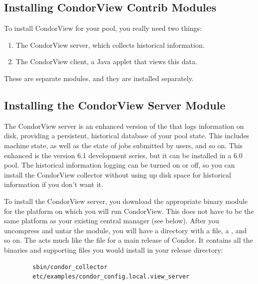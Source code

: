 \subsection{\label{sec:Contrib-CondorView-Install}
Installing CondorView Contrib Modules}


To install CondorView for your pool, you really need two things:
\begin{enumerate}
\item The CondorView server, which collects historical information.
\item The CondorView client, a Java applet that views this data.
\end{enumerate}

These are separate modules, and they are installed separately.

\subsection{\label{sec:CondorView-Server-Install}
Installing the CondorView Server Module}

The CondorView server is an enhanced version of the
that logs information on disk, providing a 
persistent, historical database of your pool state.
This includes machine state, as well as the state of jobs submitted by
users, and so on.
This enhanced  is the version 6.1 development
series, but it can be installed in a 6.0 pool.
The historical information logging can be turned on or off, so you can
install the CondorView collector without using up disk space for
historical information if you don't want it.

To install the CondorView server, you download the appropriate
binary module for the platform on which you will run CondorView.
This does not have to be the same platform as your existing central
manager (see below).
After you uncompress and untar the module, you will have a directory
with a  file, a , and so on.
The  acts much like the  file
for a main release of Condor.
It contains all the binaries and supporting files you would install in
your release directory:
\begin{verbatim}
        sbin/condor_collector
        etc/examples/condor_config.local.view_server
\end{verbatim}

